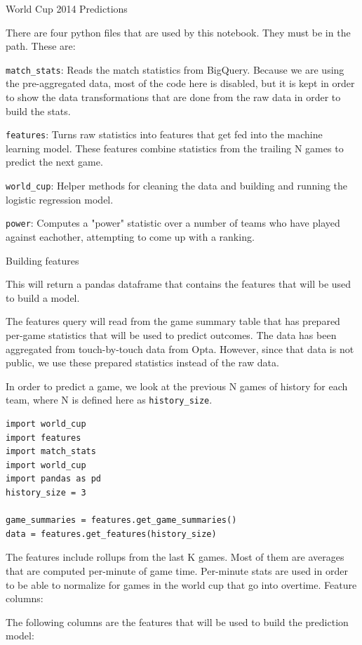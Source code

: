 \documentclass[12pt,fleqn]{article}\usepackage{common}
\begin{document}
World Cup 2014 Predictions

There are four python files that are used by this notebook. They must be in
the path. These are:

\verb!match_stats!: Reads the match statistics from BigQuery. Because we are using
the pre-aggregated data, most of the code here is disabled, but it is kept
in order to show the data transformations that are done from the raw data
in order to build the stats.

\verb!features!: Turns raw statistics into features that get fed into the machine
learning model. These features combine statistics from the trailing N games
to predict the next game.

\verb!world_cup!: Helper methods for cleaning the data and building and running
the logistic regression model.

\verb!power!: Computes a "power" statistic over a number of teams who have played
against eachother, attempting to come up with a ranking.

Building features

This will return a pandas dataframe that contains the features that will be
used to build a model.

The features query will read from the game summary table that has prepared
per-game statistics that will be used to predict outcomes. The data has
been aggregated from touch-by-touch data from Opta. However, since that
data is not public, we use these prepared statistics instead of the raw
data.

In order to predict a game, we look at the previous N games of history for
each team, where N is defined here as \verb!history_size!.

\begin{verbatim}
import world_cup
import features
import match_stats
import world_cup
import pandas as pd
history_size = 3

game_summaries = features.get_game_summaries()
data = features.get_features(history_size)
\end{verbatim}

The features include rollups from the last K games. Most of them are
averages that are computed per-minute of game time. Per-minute stats are
used in order to be able to normalize for games in the world cup that go
into overtime.  Feature columns:

The following columns are the features that will be used to build the
prediction model:
\end{document}
